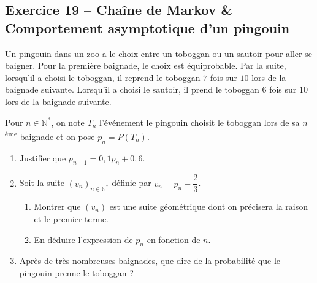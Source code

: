 \documentclass[11pt,a4paper]{article}
\newcommand{\N}{\mathbb{N}}
\begin{document}
\vspace{0.3cm}

\subsection*{Exercice 19 -- Chaîne de Markov \& Comportement asymptotique d'un pingouin}

Un pingouin dans un zoo a le choix entre un toboggan ou un sautoir pour aller se baigner. Pour la première baignade, le choix est équiprobable.
Par la suite, lorsqu'il a choisi le toboggan, il reprend le toboggan $7$ fois sur $10$ lors de la baignade suivante.
Lorsqu'il a choisi le sautoir, il prend le toboggan $6$ fois sur $10$ lors de la baignade suivante.

Pour $n \in \N^*$, on note $T_n$ l'événement \og le pingouin choisit le toboggan lors de sa $n$\textsuperscript{ème} baignade \fg{} et on pose $p_n = P(T_n)$.
\begin{enumerate}[label=\arabic*.]
    \item Justifier que $p_{n+1} = 0{,}1 p_n + 0{,}6$.
    \item Soit la suite $(v_n)_{n \in \N^*}$ définie par $v_n = p_n - \dfrac{2}{3}$.
    \begin{enumerate}
        \item Montrer que $(v_n)$ est une suite géométrique dont on précisera la raison et le premier terme.
        \item En déduire l'expression de $p_n$ en fonction de $n$.
    \end{enumerate}
    \item Après de très nombreuses baignades, que dire de la probabilité que le pingouin prenne le toboggan ?
\end{enumerate}
\end{document}
